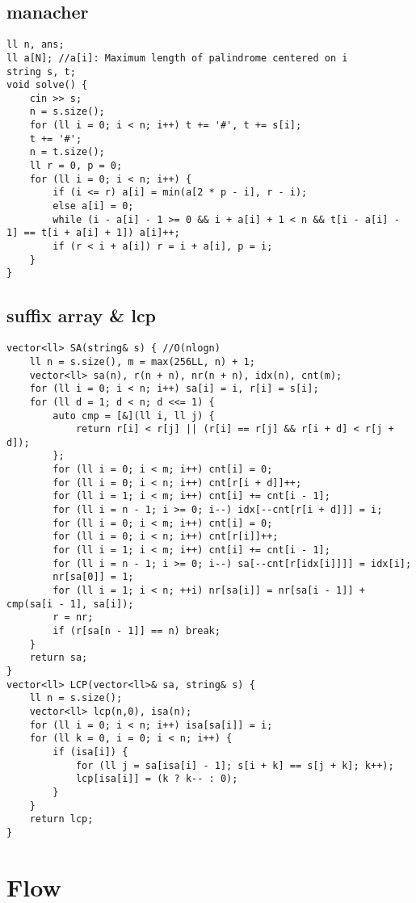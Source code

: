 \documentclass[landscape, 8pt, a4paper, oneside, twocolumn]{extarticle}
\begin{document}
\subsection{manacher}
\begin{verbatim}
ll n, ans;
ll a[N]; //a[i]: Maximum length of palindrome centered on i
string s, t;
void solve() {
    cin >> s;
    n = s.size();
    for (ll i = 0; i < n; i++) t += '#', t += s[i];
    t += '#';
    n = t.size();
    ll r = 0, p = 0;
    for (ll i = 0; i < n; i++) {
        if (i <= r) a[i] = min(a[2 * p - i], r - i);
        else a[i] = 0;
        while (i - a[i] - 1 >= 0 && i + a[i] + 1 < n && t[i - a[i] - 1] == t[i + a[i] + 1]) a[i]++;
        if (r < i + a[i]) r = i + a[i], p = i;
    }
}
\end{verbatim}
\newpage
\subsection{suffix array \& lcp}
\begin{verbatim}
vector<ll> SA(string& s) { //O(nlogn)
    ll n = s.size(), m = max(256LL, n) + 1;
    vector<ll> sa(n), r(n + n), nr(n + n), idx(n), cnt(m);
    for (ll i = 0; i < n; i++) sa[i] = i, r[i] = s[i];
    for (ll d = 1; d < n; d <<= 1) {
        auto cmp = [&](ll i, ll j) {
            return r[i] < r[j] || (r[i] == r[j] && r[i + d] < r[j + d]);
        };
        for (ll i = 0; i < m; i++) cnt[i] = 0;
        for (ll i = 0; i < n; i++) cnt[r[i + d]]++;
        for (ll i = 1; i < m; i++) cnt[i] += cnt[i - 1];
        for (ll i = n - 1; i >= 0; i--) idx[--cnt[r[i + d]]] = i;
        for (ll i = 0; i < m; i++) cnt[i] = 0;
        for (ll i = 0; i < n; i++) cnt[r[i]]++;
        for (ll i = 1; i < m; i++) cnt[i] += cnt[i - 1];
        for (ll i = n - 1; i >= 0; i--) sa[--cnt[r[idx[i]]]] = idx[i];
        nr[sa[0]] = 1;
        for (ll i = 1; i < n; ++i) nr[sa[i]] = nr[sa[i - 1]] + cmp(sa[i - 1], sa[i]);
        r = nr;
        if (r[sa[n - 1]] == n) break;
    }
    return sa;
}
vector<ll> LCP(vector<ll>& sa, string& s) {
    ll n = s.size();
    vector<ll> lcp(n,0), isa(n);
    for (ll i = 0; i < n; i++) isa[sa[i]] = i;
    for (ll k = 0, i = 0; i < n; i++) {
        if (isa[i]) {
            for (ll j = sa[isa[i] - 1]; s[i + k] == s[j + k]; k++);
            lcp[isa[i]] = (k ? k-- : 0);
        }
    }
    return lcp;
}
\end{verbatim}
\newpage
\section{Flow}
\end{document}
